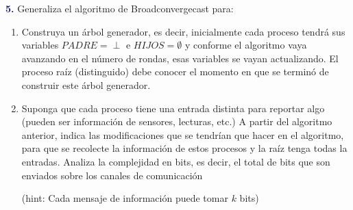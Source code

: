 \newpage
\textbf{\textcolor{MidnightBlue}{5.}}
Generaliza el algoritmo de Broadconvergecast para:
\begin{enumerate}
\item Construya un árbol generador, es decir,
inicialmente cada proceso tendrá sus variables
$PADRE = \perp$ e $HIJOS = \emptyset$ y conforme
el algoritmo vaya avanzando en el número de
rondas, esas variables se vayan actualizando.
El proceso raíz (distinguido) debe conocer el
momento en que se terminó de construir este árbol generador.

\item Suponga que cada proceso tiene una entrada
distinta para reportar algo (pueden ser información
de sensores, lecturas, etc.) A partir del algoritmo
anterior, indica las modificaciones que se tendrían
que hacer en el algoritmo, para que se recolecte la
información de estos procesos y la raíz tenga todas
la entradas. Analiza la complejidad en bits, es decir,
el total de bits que son enviados sobre los canales de
comunicación

(hint: Cada mensaje de información puede tomar $k$ bits)
\end{enumerate}
